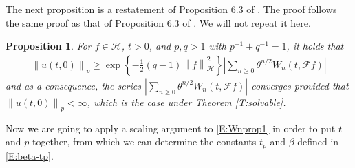 \documentclass[12pt]{report}
\theoremstyle{plain}
\newtheorem{proposition}[theorem]{Proposition}
\theoremstyle{definition}
\numberwithin{equation}{section}
\newcommand{\Norm}[1]{\left\|  #1   \right\|}
\begin{document}
The next proposition is a restatement of Proposition 6.3 of \cite{balan.chen.ea:22:exact}. The proof follows the same
proof as that of Proposition 6.3 of \cite{balan.chen.ea:22:exact}. We will not repeat it here.
\begin{proposition} \label{P:Wnprop1}
	For $f\in \mathcal{H}$, $t>0$, and $p,q>1$ with $p^{-1} + q^{-1}=1$, it holds that
	\begin{align} \label{E:Wnprop1}
	\Norm{u(t,0)}_p \ge \exp\left\{ -\frac{1}{2}(q-1)\Norm{f}_{\mathcal{H}}^2 \right\} \left| \sum_{n \ge 0} \theta^{n/2} W_n(t,\mathcal{F}f) \right|
	\end{align}
	and as a consequence, the series $\left| \sum_{n \ge 0} \theta^{n/2} W_n(t,\mathcal{F}f) \right|$
	converges provided that $\Norm{u(t,0)}_p < \infty$, which is the case under Theorem
	\ref{T:solvable}.
\end{proposition}

Now we are going to apply a scaling argument to \eqref{E:Wnprop1} in order to put $t$ and $p$
together, from which we can determine the constants $t_p$ and $\beta$ defined in \eqref{E:beta-tp}.
\end{document}
